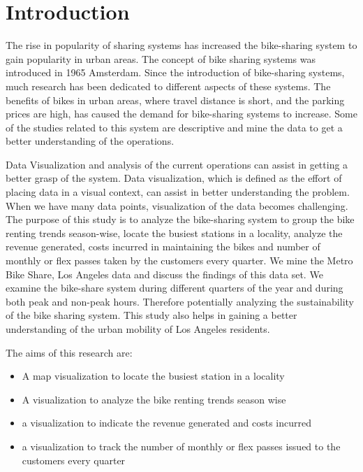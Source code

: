 \section{Introduction}
\label{sec:intro}
The rise in popularity of sharing systems has increased the bike-sharing system to gain popularity in urban areas. The concept of bike sharing systems was introduced in 1965 Amsterdam. Since the introduction of bike-sharing systems, much research has been dedicated to different aspects of these systems. The benefits of bikes in urban areas, where travel distance is short, and the parking prices are high, has caused the demand for bike-sharing systems to increase. Some of the studies related to this system are descriptive and mine the data to get a better understanding of the operations. 

Data Visualization and analysis of the current operations can assist in getting a better grasp of the system. Data visualization, which is defined as the effort of placing data in a visual context, can assist in better understanding the problem. When we have many data points, visualization of the data becomes challenging. The purpose of this study is to analyze the bike-sharing system to group the bike renting trends season-wise, locate the busiest stations in a locality, analyze the revenue generated, costs incurred in maintaining the bikes and number of monthly or flex passes taken by the customers every quarter. We mine the Metro Bike Share, Los Angeles data and discuss the findings of this data set. We examine the bike-share system during different quarters of the year and during both peak and non-peak hours. Therefore potentially analyzing the sustainability of the bike sharing system. This study also helps in gaining a better understanding of the urban mobility of Los Angeles residents. 

The aims of this research are:
\begin{itemize}
  \item A map visualization to locate the busiest station in a locality
  \item A visualization to analyze the bike renting trends season wise
  \item a visualization to indicate the revenue generated and costs incurred 
  \item a visualization to track the number of monthly or flex passes issued to the customers every quarter
\end{itemize}
